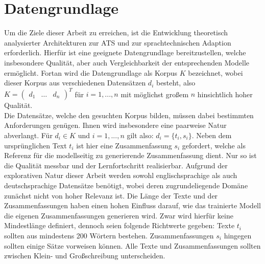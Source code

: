 \chapter{Datengrundlage}
\thispagestyle{fancy}
\label{chap:Datengrundlage}

\noindent
Um die Ziele dieser Arbeit zu erreichen, ist die Entwicklung theoretisch analysierter Architekturen zur \ac{ATS} und zur sprachtechnischen Adaption erforderlich. Hierfür ist eine geeignete Datengrundlage bereitzustellen, welche insbesondere Qualität, aber auch Vergleichbarkeit der entsprechenden Modelle ermöglicht. Fortan wird die Datengrundlage als Korpus $K$ bezeichnet, wobei dieser Korpus aus verschiedenen Datensätzen $d_i$ besteht, also $K=\begin{pmatrix} d_1 & \dots & d_n \end{pmatrix}^{T}$ für $i=1,...,n$ mit möglichst großem $n$ hinsichtlich hoher Qualität.\\

\noindent
Die Datensätze, welche den gesuchten Korpus bilden, müssen dabei bestimmten Anforderungen genügen. Ihnen wird insbesondere eine paarweise Natur abverlangt. Für $d_i \in K$ und $i=1,...,n$ gilt also: $d_i=\{t_i,s_i\}$. Neben dem ursprünglichen Text $t_i$ ist hier eine Zusammenfassung $s_i$ gefordert, welche als Referenz für die modellseitig zu generierende Zusammenfassung dient. Nur so ist die Qualität messbar und der Lernfortschritt realisierbar. Aufgrund der explorativen Natur dieser Arbeit werden sowohl englischsprachige als auch deutschsprachige Datensätze benötigt, wobei deren zugrundeliegende Domäne zunächst nicht von hoher Relevanz ist. Die Länge der Texte und der Zusammenfassungen haben einen hohen Einfluss darauf, wie das trainierte Modell die eigenen Zusammenfassungen generieren wird. Zwar wird hierfür keine Mindestlänge definiert, dennoch seien folgende Richtwerte gegeben: Texte $t_i$ sollten aus mindestens 200 Wörtern bestehen. Zusammenfassungen $s_i$ hingegen sollten einige Sätze vorweisen können. Alle Texte und Zusammenfassungen sollten zwischen Klein- und Großschreibung unterscheiden.\\

